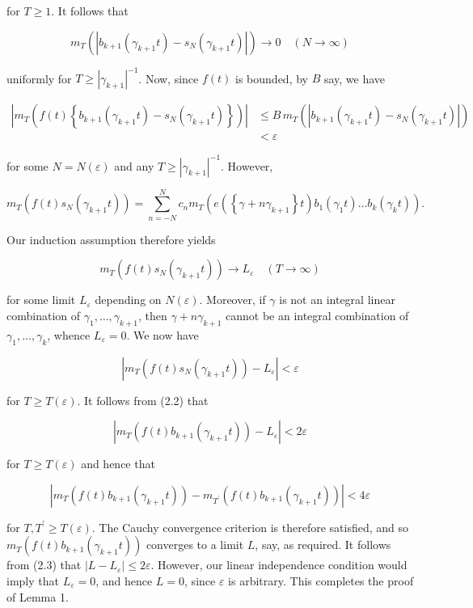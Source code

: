 \documentclass[10pt]{article}
\begin{document}
for $T \geq 1$. It follows that

$$
m_{T}\left(\left|b_{k+1}\left(\gamma_{k+1} t\right)-s_{N}\left(\gamma_{k+1} t\right)\right|\right) \rightarrow 0 \quad(N \rightarrow \infty)
$$

uniformly for $T \geq |\gamma_{k+1}|^{-1}$. Now, since $f(t)$ is bounded, by $B$ say, we have


\begin{align*}
\left|m_{T}\left(f(t)\left\{b_{k+1}\left(\gamma_{k+1}t\right)-s_{N}\left(\gamma_{k+1}t\right)\right\}\right)\right|
&\leq B\,m_{T}\left(\left|b_{k+1}\left(\gamma_{k+1}t\right)-s_{N}\left(\gamma_{k+1}t\right)\right|\right) \\
&<\varepsilon \tag{2.2}
\end{align*}


for some $N=N(\varepsilon)$ and any $T \geq |\gamma_{k+1}|^{-1}$. However,

$$
m_{T}\left(f(t) s_{N}\left(\gamma_{k+1} t\right)\right)=\sum_{n=-N}^{N} c_{n} m_{T}\left(e\left(\left\{\gamma+n \gamma_{k+1}\right\} t\right) b_{1}\left(\gamma_{1} t\right) \ldots b_{k}\left(\gamma_{k} t\right)\right) .
$$

Our induction assumption therefore yields

$$
m_{T}\left(f(t) s_{N}\left(\gamma_{k+1} t\right)\right) \rightarrow L_{\varepsilon} \quad(T \rightarrow \infty)
$$

for some limit $L_{\varepsilon}$ depending on $N(\varepsilon)$. Moreover, if $\gamma$ is not an integral linear combination of $\gamma_{1}, \ldots, \gamma_{k+1}$, then $\gamma+n \gamma_{k+1}$ cannot be an integral combination of $\gamma_{1}, \ldots, \gamma_{k}$, whence $L_{\varepsilon}=0$. We now have

$$
\left|m_{T}\left(f(t) s_{N}\left(\gamma_{k+1} t\right)\right)-L_{\varepsilon}\right|<\varepsilon
$$

for $T \geq T(\varepsilon)$. It follows from (2.2) that


\begin{equation*}
\left|m_{T}\left(f(t) b_{k+1}\left(\gamma_{k+1} t\right)\right)-L_{\varepsilon}\right|<2 \varepsilon \tag{2.3}
\end{equation*}


for $T \geq T(\varepsilon)$ and hence that

$$
\left|m_{T}\left(f(t) b_{k+1}\left(\gamma_{k+1} t\right)\right)-m_{T^{\prime}}\left(f(t) b_{k+1}\left(\gamma_{k+1} t\right)\right)\right|<4 \varepsilon
$$

for $T, T^{\prime} \geq T(\varepsilon)$. The Cauchy convergence criterion is therefore satisfied, and so $m_{T}\left(f(t) b_{k+1}\left(\gamma_{k+1} t\right)\right)$ converges to a limit $L$, say, as required. It follows from (2.3) that $\left|L-L_{\varepsilon}\right| \leq 2 \varepsilon$. However, our linear independence condition would imply that $L_{\varepsilon}=0$, and hence $L=0$, since $\varepsilon$ is arbitrary. This completes the proof of Lemma 1.
\end{document}
